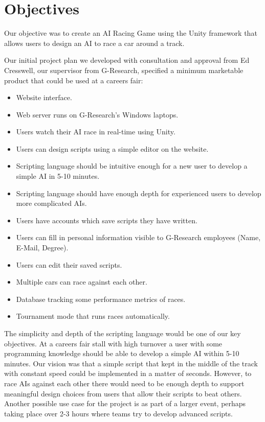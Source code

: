 \section{Objectives}
Our objective was to create an AI Racing Game using the Unity framework that allows users to design an AI to race a car around a track.

Our initial project plan we developed with consultation and approval from Ed Cresswell, our supervisor from G-Research, specified a minimum marketable product that could be used at a careers fair:

\begin{itemize}
	\item Website interface.
	\item Web server runs on G-Research's Windows laptops.
	\item Users watch their AI race in real-time using Unity.
	\item Users can design scripts using a simple editor on the website.
	\item Scripting language should be intuitive enough for a new user to develop a simple AI in 5-10 minutes.
	\item Scripting language should have enough depth for experienced users to develop more complicated AIs.
	\item Users have accounts which save scripts they have written.
	\item Users can fill in personal information visible to G-Research employees (Name, E-Mail, Degree).
	\item Users can edit their saved scripts.
	\item Multiple cars can race against each other.
	\item Database tracking some performance metrics of races.
	\item Tournament mode that runs races automatically.
\end{itemize}

The simplicity and depth of the scripting language would be one of our key objectives. At a careers fair stall with high turnover a user with some programming knowledge should be able to develop a simple AI within 5-10 minutes. Our vision was that a simple script that kept in the middle of the track with constant speed could be implemented in a matter of seconds. However, to race AIs against each other there would need to be enough depth to support meaningful design choices from users that allow their scripts to beat others. Another possible use case for the project is as part of a larger event, perhaps taking place over 2-3 hours where teams try to develop advanced scripts.

